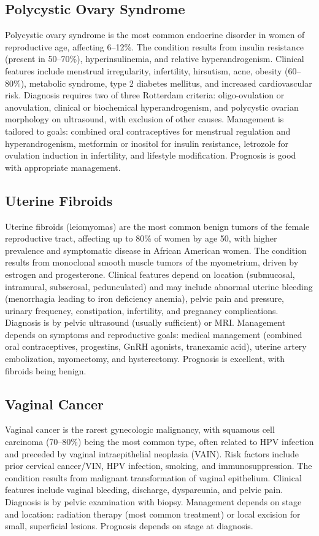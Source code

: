 \subsection{Polycystic Ovary Syndrome}
\label{sec:Polycystic Ovary Syndrome}
Polycystic ovary syndrome is the most common endocrine disorder in women of reproductive age, affecting 6--12\%. The condition results from insulin resistance (present in 50--70\%), hyperinsulinemia, and relative hyperandrogenism. Clinical features include menstrual irregularity, infertility, hirsutism, acne, obesity (60--80\%), metabolic syndrome, type 2 diabetes mellitus, and increased cardiovascular risk. Diagnosis requires two of three Rotterdam criteria: oligo-ovulation or anovulation, clinical or biochemical hyperandrogenism, and polycystic ovarian morphology on ultrasound, with exclusion of other causes. Management is tailored to goals: combined oral contraceptives for menstrual regulation and hyperandrogenism, metformin or inositol for insulin resistance, letrozole for ovulation induction in infertility, and lifestyle modification. Prognosis is good with appropriate management.

\subsection{Uterine Fibroids}
\label{sec:Uterine Fibroids}
Uterine fibroids (leiomyomas) are the most common benign tumors of the female reproductive tract, affecting up to 80\% of women by age 50, with higher prevalence and symptomatic disease in African American women. The condition results from monoclonal smooth muscle tumors of the myometrium, driven by estrogen and progesterone. Clinical features depend on location (submucosal, intramural, subserosal, pedunculated) and may include abnormal uterine bleeding (menorrhagia leading to iron deficiency anemia), pelvic pain and pressure, urinary frequency, constipation, infertility, and pregnancy complications. Diagnosis is by pelvic ultrasound (usually sufficient) or MRI. Management depends on symptoms and reproductive goals: medical management (combined oral contraceptives, progestins, GnRH agonists, tranexamic acid), uterine artery embolization, myomectomy, and hysterectomy. Prognosis is excellent, with fibroids being benign.

\subsection{Vaginal Cancer}
\label{sec:Vaginal Cancer}
Vaginal cancer is the rarest gynecologic malignancy, with squamous cell carcinoma (70--80\%) being the most common type, often related to HPV infection and preceded by vaginal intraepithelial neoplasia (VAIN). Risk factors include prior cervical cancer/VIN, HPV infection, smoking, and immunosuppression. The condition results from malignant transformation of vaginal epithelium. Clinical features include vaginal bleeding, discharge, dyspareunia, and pelvic pain. Diagnosis is by pelvic examination with biopsy. Management depends on stage and location: radiation therapy (most common treatment) or local excision for small, superficial lesions. Prognosis depends on stage at diagnosis.

